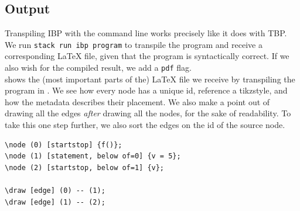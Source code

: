 
\subsection{Output}

Transpiling IBP with the command line works precisely like it does with TBP. We run \texttt{stack run ibp program} to transpile the program and receive a corresponding LaTeX file, given that the program is syntactically correct. If we also wish for the compiled result, we add a \texttt{pdf} flag. \\

 shows the (most important parts of the) LaTeX file we receive by transpiling the program in . We see how every node has a unique id, reference a tikzstyle, and how the metadata describes their placement. We also make a point out of drawing all the edges \textit{after} drawing all the nodes, for the sake of readability. To take this one step further, we also sort the edges on the id of the source node. \\

\begin{lstlisting}[caption={Excerpt of the LaTeX from transpiling \Cref{Gourmet f} to IBP.}, captionpos=b, label={Example output from compiling Flowchart}]
\node (0) [startstop] {f()};
\node (1) [statement, below of=0] {v = 5};
\node (2) [startstop, below of=1] {v};

\draw [edge] (0) -- (1);
\draw [edge] (1) -- (2);
\end{lstlisting}
